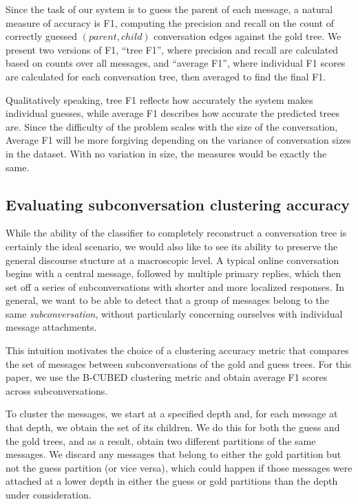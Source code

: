 \documentclass{article}
\begin{document}
Since the task of our system is to guess the parent of each message, a natural
measure of accuracy is F1, computing the precision and recall on the count of
correctly guessed $(parent,child)$ conversation edges against the gold tree.
We present two versions of F1, ``tree F1'', where precision and recall are
calculated based on counts over all messages, and ``average F1'', where
individual F1 scores are calculated for each conversation tree, then averaged
to find the final F1.

Qualitatively speaking, tree F1 reflects how accurately the system makes
individual guesses, while average F1 describes how accurate the predicted
trees are. Since the difficulty of the problem scales with the size of the
conversation, Average F1 will be more forgiving depending on the variance of
conversation sizes in the dataset. With no variation in size, the measures
would be exactly the same.

\subsection{Evaluating subconversation clustering accuracy}
While the ability of the classifier to completely reconstruct a conversation
tree is certainly the ideal scenario, we would also like to see its ability to
preserve the general discourse stucture at a macroscopic level. A typical
online conversation begins with a central message, followed by multiple
primary replies, which then set off a series of subconversations with shorter
and more localized responses. In general, we want to be able to detect that a
group of messages belong to the same \emph{subconversation}, without
particularly concerning ourselves with individual message attachments.

This intuition motivates the choice of a clustering accuracy metric that
compares the set of messages between subconversations of the gold and guess
trees. For this paper, we use the B-CUBED clustering metric \cite{Bagga98} and
obtain average F1 scores across subconversations.

To cluster the messages, we start at a specified depth and, for each message
at that depth, we obtain the set of its children. We do this for both the
guess and the gold trees, and as a result, obtain two different partitions of
the same messages. We discard any messages that belong to either the gold
partition but not the guess partition (or vice versa), which could happen if
those messages were attached at a lower depth in either the guess or gold
partitions than the depth under consideration.
\end{document}
